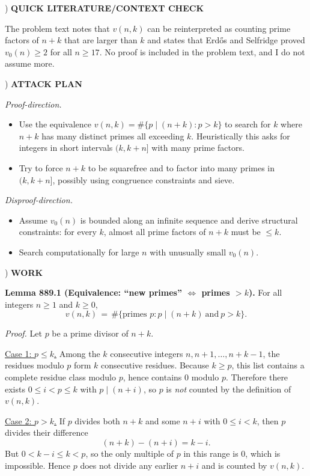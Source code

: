 ) \textbf{QUICK LITERATURE/CONTEXT CHECK}

\noindent The problem text notes that $v(n,k)$ can be reinterpreted as counting prime factors of $n+k$ that are larger than $k$ and states that Erd\H{o}s and Selfridge proved $v_0(n)\ge 2$ for all $n\ge 17$. No proof is included in the problem text, and I do not assume more.

) \textbf{ATTACK PLAN}

\noindent 
\emph{Proof-direction.}
\begin{itemize}
\item Use the equivalence $v(n,k)=\#\{p\mid(n+k): p>k\}$ to search for $k$ where $n+k$ has many distinct primes all exceeding $k$. Heuristically this asks for integers in short intervals $(k,k+n]$ with many prime factors.
\item Try to force $n+k$ to be squarefree and to factor into many primes in $(k,k+n]$, possibly using congruence constraints and sieve.
\end{itemize}

\noindent \emph{Disproof-direction.}
\begin{itemize}
\item Assume $v_0(n)$ is bounded along an infinite sequence and derive structural constraints: for every $k$, almost all prime factors of $n+k$ must be $\le k$.
\item Search computationally for large $n$ with unusually small $v_0(n)$.
\end{itemize}

) \textbf{WORK}

\noindent \textbf{Lemma 889.1 (Equivalence: ``new primes'' $\Leftrightarrow$ primes $>k$).}
For all integers $n\ge 1$ and $k\ge 0$,
\[
 v(n,k) \,=\, \#\{\text{primes }p: p\mid(n+k)\ \text{and}\ p>k\}.
\]

\noindent \emph{Proof.}
Let $p$ be a prime divisor of $n+k$.

\noindent \underline{Case 1: $p\le k$.}
Among the $k$ consecutive integers $n,n+1,\dots,n+k-1$, the residues modulo $p$ form $k$ consecutive residues.
Because $k\ge p$, this list contains a complete residue class modulo $p$, hence contains $0$ modulo $p$.
Therefore there exists $0\le i<p\le k$ with $p\mid(n+i)$, so $p$ is \emph{not} counted by the definition of $v(n,k)$.

\noindent \underline{Case 2: $p>k$.}
If $p$ divides both $n+k$ and some $n+i$ with $0\le i<k$, then $p$ divides their difference
\[
 (n+k)-(n+i) = k-i.
\]
But $0<k-i\le k<p$, so the only multiple of $p$ in this range is $0$, which is impossible.
Hence $p$ does not divide any earlier $n+i$ and is counted by $v(n,k)$.

